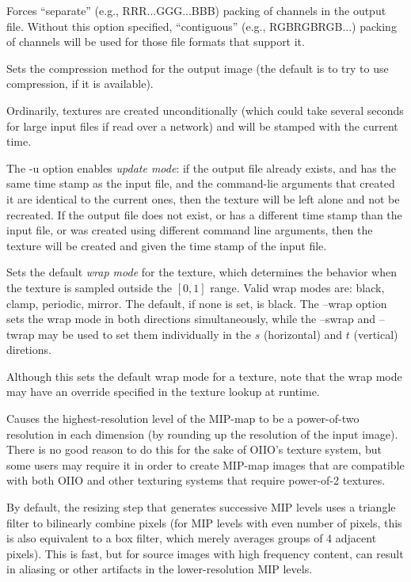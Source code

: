 Forces ``separate'' (e.g., RRR...GGG...BBB) packing of channels in the
output file.  Without this option specified, ``contiguous'' (e.g.,
RGBRGBRGB...) packing of channels will be used for those file formats
that support it.
\apiend

Sets the compression method for the output image (the default is to try
to use  compression, if it is available).
\apiend

Ordinarily, textures are created unconditionally (which could take
several seconds for large input files if read over a network) and will
be stamped with the current time.

The {\cf -u} option enables \emph{update mode}: if the output file
already exists, and has the same time stamp as the input file, and
the command-lie arguments that created it are identical to the
current ones, then the texture will be left alone and not be recreated.
If the output file does not exist, or has
a different time stamp than the input file, or was created using different
command line arguments, then the texture will be created
and given the time stamp of the input file.
\apiend

Sets the default \emph{wrap mode} for the texture, which determines
the behavior when the texture is sampled outside the $[0,1]$ range.
Valid wrap modes are: {\cf black}, {\cf clamp}, {\cf periodic},
{\cf mirror}.  The default, if none is set, is {\cf black}.  The
{\cf --wrap} option sets the wrap mode in both directions
simultaneously, while the {\cf --swrap} and {\cf --twrap} may be used to
set them individually in the $s$ (horizontal) and $t$ (vertical)
diretions.

Although this sets the default wrap mode for a texture, note that
the wrap mode may have an override specified in the texture lookup
at runtime.
\apiend

Causes the highest-resolution level of the MIP-map to be a
power-of-two resolution in each dimension
(by rounding up the resolution of the input image).  There is no
good reason to do this for the sake of OIIO's texture system, but 
some users may require it in order to create MIP-map images
that are compatible with both OIIO and other texturing systems that
require power-of-2 textures.
\apiend

By default, the resizing step that generates successive MIP levels
uses a triangle filter to bilinearly combine pixels (for MIP levels
with even number of pixels, this is also equivalent to a box filter,
which merely averages groups of 4 adjacent pixels).  This is fast,
but for source images with high frequency content, can result in 
aliasing or other artifacts in the lower-resolution MIP levels.

